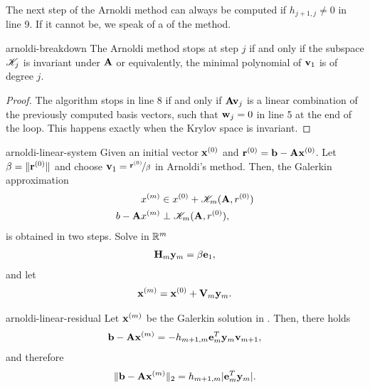 \begin{remark}
  The next step of the Arnoldi method can always be computed if
  $h_{j+1,j}\neq 0$ in line 9. If it cannot be, we speak of a
   of the method.
\end{remark}

\begin{Lemma}{arnoldi-breakdown}
  The Arnoldi method stops at step $j$ if and only if the subspace $\mathscr K_j$ is invariant under $\mathbf A$ or equivalently, the minimal polynomial of $\mathbf v_1$ is of degree $j$.
\end{Lemma}

\begin{proof}
  The algorithm stops in line 8 if and only if $\mathbf A\mathbf v_j$ is a
  linear combination of the previously computed basis vectors, such
  that $\mathbf w_j=0$ in line 5 at the end of the loop. This happens
  exactly when the Krylov space is invariant.
\end{proof}

\begin{Theorem}{arnoldi-linear-system}
  Given an initial vector $\mathbf x^{(0)}$ and
  $\mathbf r^{(0)} = \mathbf b - \mathbf A \mathbf x^{(0)}$. Let $\beta=\lVert\mathbf r^{(0)}\rVert$
  and choose $\mathbf v_1 =\nicefrac{\mathbf r^{(0)}}{\beta}$ in Arnoldi's
  method. Then, the Galerkin approximation
  \begin{align}
    x^{(m)} &\in x^{(0)} + \mathscr K_m(\mathbf A,r^{(0)})\\
    b-\mathbf A x^{(m)} &\perp \mathscr K_m(\mathbf A,r^{(0)}),
  \end{align}
  is obtained in two steps. Solve in $\mathbb R^m$
  \begin{gather}
    \mathbf H_m\mathbf y_m = \beta\mathbf e_1,
  \end{gather}
  and let
  \begin{gather}
    \mathbf x^{(m)} = \mathbf x^{(0)} + \mathbf V_m \mathbf y_m.
  \end{gather}
\end{Theorem}

\begin{Theorem}{arnoldi-linear-residual}
  Let $\mathbf x^{(m)}$ be the Galerkin solution in
  . Then, there holds
  \begin{gather}
    \mathbf b-\mathbf A\mathbf x^{(m)} = -h_{m+1,m} \mathbf e_m^T \mathbf y_m \mathbf v_{m+1},
  \end{gather}
  and therefore
  \begin{gather}
    \lVert\mathbf b-\mathbf A\mathbf x^{(m)}\rVert_2 = h_{m+1,m} \lvert\mathbf e_m^T \mathbf y_m\rvert.
  \end{gather}  
\end{Theorem}

